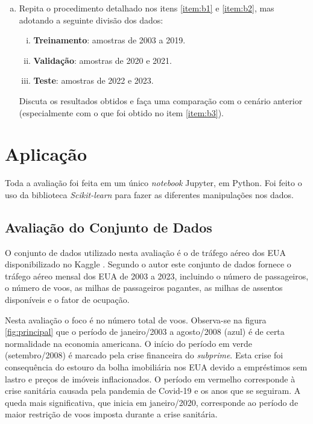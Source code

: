 \documentclass[final,5p]{elsarticle}
\numberwithin{equation}{section}
\begin{document}
\begin{enumerate}[(a)]
        \item Repita o procedimento detalhado nos itens \ref{item:b1} e \ref{item:b2}, mas adotando a seguinte divisão dos dados:

        \begin{enumerate}[(i)]
            \item \textbf{Treinamento}: amostras de 2003 a 2019.
            \item \textbf{Validação}: amostras de 2020 e 2021.
            \item \textbf{Teste}: amostras de 2022 e 2023.
        \end{enumerate}

        Discuta os resultados obtidos e faça uma comparação com o cenário anterior (especialmente
        com o que foi obtido no item \ref{item:b3}).
    \end{enumerate}

\section{Aplicação}

    Toda a avaliação foi feita em um único \emph{notebook} Jupyter, em Python. Foi feito o uso da biblioteca \emph{Scikit-learn} \cite{scikit-learn} para fazer as diferentes manipulações nos dados.

    \subsection{Avaliação do Conjunto de Dados}

    O conjunto de dados utilizado nesta avaliação é o de tráfego aéreo dos EUA disponibilizado no Kaggle \cite{YYXian_2024}. Segundo o autor este conjunto de dados fornece o tráfego aéreo mensal dos EUA de 2003 a 2023, incluindo o número de passageiros, o número de voos, as milhas de passageiros pagantes, as milhas de assentos disponíveis e o fator de ocupação.

    Nesta avaliação o foco é no número total de voos. Observa-se na figura \ref{fig:principal} que o período de janeiro/2003 a agosto/2008 (azul) é de certa normalidade na economia americana. O início do período em verde (setembro/2008) é marcado pela crise financeira do \emph{subprime}. Esta crise foi consequência do estouro da bolha imobiliária nos EUA devido a empréstimos sem lastro e preços de imóveis inflacionados. O período em vermelho corresponde à crise sanitária causada pela pandemia de Covid-19 e os anos que se seguiram. A queda mais significativa, que inicia em janeiro/2020, corresponde ao período de maior restrição de voos imposta durante a crise sanitária.
\end{document}
